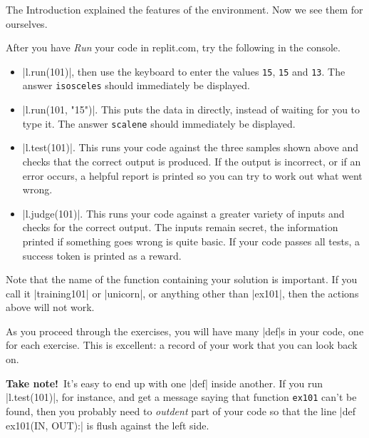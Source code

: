 The Introduction explained the features of the \learninformatics{} environment. Now
we see them for ourselves.

After you have \emph{Run} your code in replit.com, try the following in the console.
\begin{itemize}
  \item \pycode|l.run(101)|, then use the keyboard to enter the values \texttt{15},
    \texttt{15} and \texttt{13}. The answer \texttt{isosceles} should immediately be
    displayed.
  \item \pycode|l.run(101, "15\n")|. This puts the data in directly, instead of
    waiting for you to type it. The answer \texttt{scalene} should immediately be
    displayed.
  \item \pycode|l.test(101)|. This runs your code against the three samples shown
    above and checks that the correct output is produced. If the output is incorrect, or
    if an error occurs, a helpful report is printed so you can try to work out what went
    wrong.
  \item \pycode|l.judge(101)|. This runs your code against a greater variety of inputs and
    checks for the correct output. The inputs remain secret, the information printed if
    something goes wrong is quite basic. If your code passes all tests, a success token is
    printed as a reward.
\end{itemize}

Note that the name of the function containing your solution is important. If you call it
\pycode|training101| or \pycode|unicorn|, or anything other than \pycode|ex101|, then the
actions above will not work.

\begin{tcolorbox}
  As you proceed through the exercises, you will have many \pycode|def|s in your code, one
  for each exercise. This is excellent: a record of your work that you can look back on.

  \vspace{12pt}
  \textbf{Take note!}\quad\ It's easy to end up with one \pycode|def| inside another. If you run
  \pycode|l.test(101)|, for instance, and get a message saying that function
  \texttt{ex101} can't be found, then you probably need to \emph{outdent} part of your
  code so that the line \pycode|def ex101(IN, OUT):| is flush against the left side.
\end{tcolorbox}



